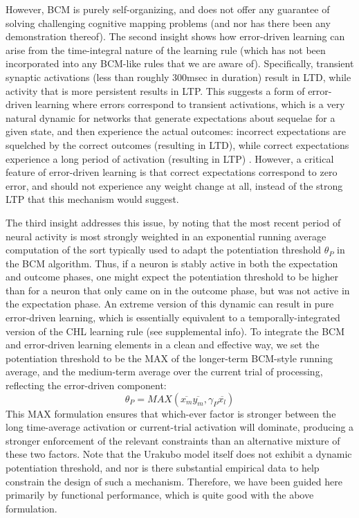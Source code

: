\documentclass[11pt,twoside]{article}
\begin{document}
However, BCM is purely self-organizing, and does not offer any guarantee of
solving challenging cognitive mapping problems (and nor has there been any
demonstration thereof).  The second insight shows how error-driven learning
can arise from the time-integral nature of the learning rule (which has not
been incorporated into any BCM-like rules that we are aware of).
Specifically, transient synaptic activations (less than roughly 300msec in
duration) result in LTD, while activity that is more persistent results in
LTP.  This suggests a form of error-driven learning where errors correspond
to transient activations, which is a very natural dynamic for networks that
generate expectations about sequelae for a given state, and then experience
the actual outcomes: incorrect expectations are squelched by the correct
outcomes (resulting in LTD), while correct expectations experience a long
period of activation (resulting in LTP)
\cite{OReilly96,OReillyMunakata00,McClelland94}.  However, a critical feature
of error-driven learning is that correct expectations correspond to zero
error, and should not experience any weight change at all, instead of the
strong LTP that this mechanism would suggest.

The third insight addresses this issue, by noting that the most recent period
of neural activity is most strongly weighted in an exponential running average
computation of the sort typically used to adapt the potentiation threshold
$\theta_P$ in the BCM algorithm.  Thus, if a neuron is stably active in both
the expectation and outcome phases, one might expect the potentiation
threshold to be higher than for a neuron that only came on in the outcome
phase, but was not active in the expectation phase.  An extreme version of
this dynamic can result in pure error-driven learning, which is essentially
equivalent to a temporally-integrated version of the CHL learning rule (see
supplemental info).  To integrate the BCM and error-driven learning elements
in a clean and effective way, we set the potentiation threshold to be the MAX
of the longer-term BCM-style running average, and the medium-term average
over the current trial of processing, reflecting the error-driven component:
\begin{equation}
  \theta_P = MAX(\overline{x_m} \overline{y_m}, \gamma_P \overline{x_l})
\end{equation}
This MAX formulation ensures that which-ever factor is stronger between the
long time-average activation or current-trial activation will dominate,
producing a stronger enforcement of the relevant constraints than an
alternative mixture of these two factors.  Note that the Urakubo model itself
does not exhibit a dynamic potentiation threshold, and nor is there
substantial empirical data to help constrain the design of such a mechanism.
Therefore, we have been guided here primarily by functional performance, which
is quite good with the above formulation.
\end{document}
